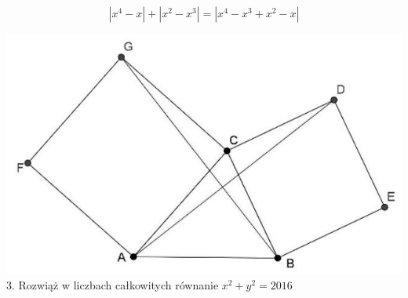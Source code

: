 \documentclass[10pt]{article}
\begin{document}
\[
\left|x^{4}-x\right|+\left|x^{2}-x^{3}\right|=\left|x^{4}-x^{3}+x^{2}-x\right|
\]

\includegraphics[max width=\textwidth, center]{2024_11_21_cdd85e6b4cedf5476676g-1(1)}\\
3. Rozwiąż w liczbach całkowitych równanie \(x^{2}+y^{2}=2016\)
\end{document}
